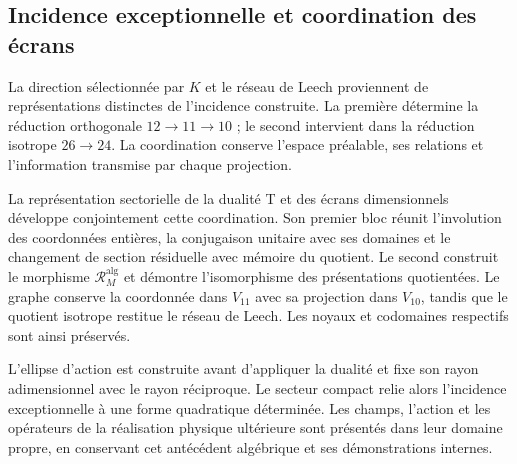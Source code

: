 \subsection{Incidence exceptionnelle et coordination des écrans}
\label{exc:pantallas-dualidad}

La direction sélectionnée par \(K\) et le réseau de Leech proviennent
de représentations distinctes de l’incidence construite. La première
détermine la réduction orthogonale \(12\to11\to10\) ; le second
intervient dans la réduction isotrope \(26\to24\). La coordination
conserve l’espace préalable, ses relations et l’information transmise
par chaque projection.

La représentation sectorielle de la dualité T et des écrans dimensionnels développe conjointement cette coordination. Son premier bloc réunit l'involution des coordonnées entières, la conjugaison unitaire avec ses domaines et le changement de section résiduelle avec mémoire du quotient. Le second construit le morphisme \(\mathcal R_M^{\mathrm{alg}}\) et démontre l'isomorphisme des présentations quotientées. Le graphe conserve la coordonnée dans \(V_{11}\) avec sa projection dans \(V_{10}\), tandis que le quotient isotrope restitue le réseau de Leech. Les noyaux et codomaines respectifs sont ainsi préservés.

L’ellipse d’action est construite avant d’appliquer la dualité et fixe
son rayon adimensionnel avec le rayon réciproque. Le secteur compact relie alors
l’incidence exceptionnelle à une forme quadratique déterminée. Les
champs, l’action et les opérateurs de la réalisation physique ultérieure
sont présentés dans leur domaine propre, en conservant cet antécédent
algébrique et ses démonstrations internes.
